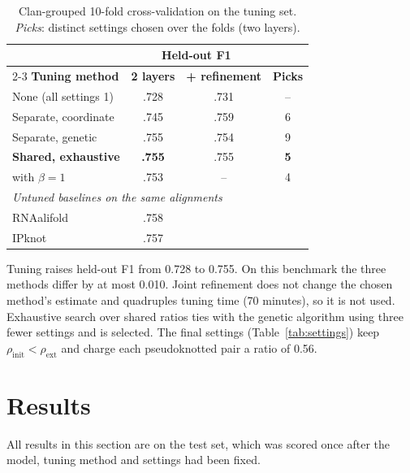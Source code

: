 \documentclass[10pt, twocolumn]{article}
\newcommand{\rinit}{\rho_{\mathrm{init}}}
\newcommand{\rext}{\rho_{\mathrm{ext}}}
\begin{document}
\begin{table}[h]
\centering\small
\setlength{\tabcolsep}{3.5pt}
\begin{tabular}{lccc}
\toprule
 & \multicolumn{2}{c}{\textbf{Held-out F1}} & \\
\cmidrule(lr){2-3}
\textbf{Tuning method} & \textbf{2 layers} & \textbf{+ refinement} & \textbf{Picks}\\
\midrule
None (all settings 1) & .728 & .731 & --\\
Separate, coordinate & .745 & .759 & 6\\
Separate, genetic & .755 & .754 & 9\\
\textbf{Shared, exhaustive} & \textbf{.755} & .755 & \textbf{5}\\
\quad with $\beta=1$ & .753 & -- & 4\\
\midrule
\multicolumn{4}{l}{\textit{Untuned baselines on the same alignments}}\\
RNAalifold & .758 & & \\
IPknot & .757 & & \\
\bottomrule
\end{tabular}
\caption{Clan-grouped 10-fold cross-validation on the tuning set. \emph{Picks}: distinct settings chosen over the folds (two layers).}
\label{tab:cv}
\end{table}

Tuning raises held-out F1 from 0.728 to 0.755. On this benchmark the three methods differ by at most 0.010. Joint refinement does not change the chosen method's estimate and quadruples tuning time (70 minutes), so it is not used. Exhaustive search over shared ratios ties with the genetic algorithm using three fewer settings and is selected. The final settings (Table~\ref{tab:settings}) keep $\rinit<\rext$ and charge each pseudoknotted pair a ratio of 0.56.

\section{Results}
\label{sec:results}
All results in this section are on the test set, which was scored once after the model, tuning method and settings had been fixed.
\end{document}
